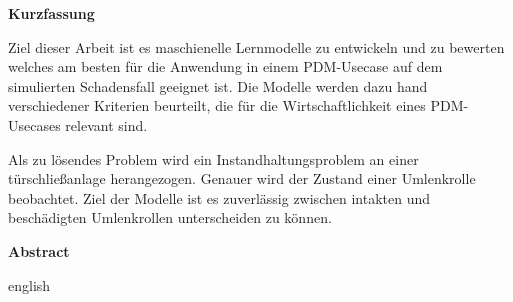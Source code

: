 \begin{center}
	\textbf{Kurzfassung}
\end{center}
\raggedright



Ziel dieser Arbeit ist es maschienelle Lernmodelle zu entwickeln und zu bewerten welches am besten für die Anwendung in einem PDM-Usecase auf dem simulierten Schadensfall geeignet ist. Die Modelle werden dazu hand verschiedener Kriterien beurteilt, die für die Wirtschaftlichkeit eines PDM-Usecases relevant sind. 

Als zu lösendes Problem wird ein Instandhaltungsproblem an einer türschließanlage herangezogen. Genauer wird der Zustand einer Umlenkrolle beobachtet. Ziel der Modelle ist es zuverlässig zwischen intakten und beschädigten Umlenkrollen unterscheiden zu können.
\clearpage
\begin{center}
	\textbf{Abstract}
\end{center}
\raggedright
english
\clearpage